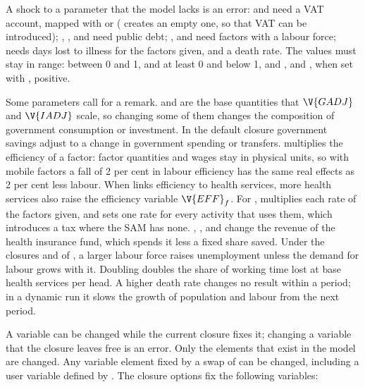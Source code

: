 A shock to a parameter that the model lacks is an error:  and
 need a VAT account, mapped with  or
 ( creates an empty one, so that VAT can be
introduced); , ,  and  need public debt;
,  and  need factors with a labour force;
 needs days lost to illness for the factors given, and  a
death rate. The values must stay in range:  between 0 and 1,
 and  at least 0 and below 1, and ,  and
, when set with , positive.

Some parameters call for a remark.  and  are the base
quantities that $\V{GADJ}$ and $\V{IADJ}$ scale, so changing some of them
changes the composition of government consumption or investment. In the
default closure government savings adjust to a change in government spending
or transfers.  multiplies the efficiency of a factor: factor quantities
and wages stay in physical units, so with mobile factors a fall of 2 per cent
in labour efficiency has the same real effects as 2 per cent less labour. When
 links efficiency to health services, more health
services also raise the efficiency variable $\V{EFF}_f$. For ,
 multiplies each rate of the factors given, and
 sets one rate for every activity that uses them, which
introduces a tax where the SAM has none. , , 
and  change the revenue of the health insurance fund, which spends
it less a fixed share saved. Under the closures  and
 of , a larger labour force raises
unemployment unless the demand for labour grows with it. Doubling 
doubles the share of working time lost at base health services per head. A
higher death rate changes no result within a period; in a dynamic run it slows
the growth of population and labour from the next period.


A variable can be changed while the current closure fixes it; changing a
variable that the closure leaves free is an error. Only the elements that
exist in the model are changed. Any variable element fixed by a swap of
 can be changed, including a user variable defined by
. The closure options fix the following variables:

